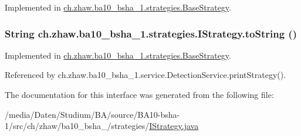 Implemented in \hyperlink{classch_1_1zhaw_1_1ba10__bsha__1_1_1strategies_1_1BaseStrategy_acfeb454c9eda3e3279c75ce8101d980c}{ch.zhaw.ba10\_\-bsha\_\-1.strategies.BaseStrategy}.\hypertarget{interfacech_1_1zhaw_1_1ba10__bsha__1_1_1strategies_1_1IStrategy_a2b109250e12270545e1c342c9d136bcd}{
\subsubsection[{toString}]{\setlength{\rightskip}{0pt plus 5cm}String ch.zhaw.ba10\_\-bsha\_\-1.strategies.IStrategy.toString ()}}
\label{interfacech_1_1zhaw_1_1ba10__bsha__1_1_1strategies_1_1IStrategy_a2b109250e12270545e1c342c9d136bcd}


Implemented in \hyperlink{classch_1_1zhaw_1_1ba10__bsha__1_1_1strategies_1_1BaseStrategy_adfb24fbd69261e8567269c5d59365e46}{ch.zhaw.ba10\_\-bsha\_\-1.strategies.BaseStrategy}.

Referenced by ch.zhaw.ba10\_\-bsha\_\-1.service.DetectionService.printStrategy().

The documentation for this interface was generated from the following file:\begin{DoxyCompactItemize}
\item 
/media/Daten/Studium/BA/source/BA10-\/bsha-\/1/src/ch/zhaw/ba10\_\-bsha\_/strategies/\hyperlink{IStrategy_8java}{IStrategy.java}\end{DoxyCompactItemize}
